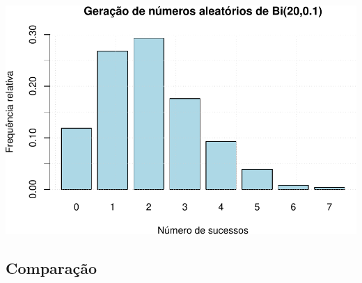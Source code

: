 \documentclass[
]{book}
\begin{document}
\includegraphics{introR_files/figure-latex/unnamed-chunk-256-1.pdf}

\subsection{Comparação}\label{comparauxe7uxe3o}
\end{document}
